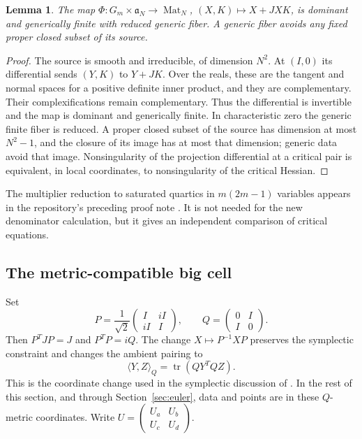 \documentclass[11pt]{article}
\newtheorem{lemma}[theorem]{Lemma}
\theoremstyle{remark}\newtheorem{remark}[theorem]{Remark}
\DeclareMathOperator{\tr}{tr}
\DeclareMathOperator{\Mat}{Mat}
\begin{document}
\begin{lemma}\label{lem:generic}
The map $\Phi:G_m\times\mathfrak a_N\to\Mat_N$, $(X,K)\mapsto X+JXK$, is dominant and generically finite with reduced generic fiber. A generic fiber avoids any fixed proper closed subset of its source.
\end{lemma}
\begin{proof}
The source is smooth and irreducible, of dimension $N^2$. At $(I,0)$ its differential sends $(Y,K)$ to $Y+JK$. Over the reals, these are the tangent and normal spaces for a positive definite inner product, and they are complementary. Their complexifications remain complementary. Thus the differential is invertible and the map is dominant and generically finite. In characteristic zero the generic finite fiber is reduced. A proper closed subset of the source has dimension at most $N^2-1$, and the closure of its image has at most that dimension; generic data avoid that image. Nonsingularity of the projection differential at a critical pair is equivalent, in local coordinates, to nonsingularity of the critical Hessian.
\end{proof}
The multiplier reduction to saturated quartics in $m(2m-1)$ variables appears in the repository's preceding proof note \cite{holden}. It is not needed for the new denominator calculation, but it gives an independent comparison of critical equations.

\subsection{The metric-compatible big cell}
Set
\[
P=\frac1{\sqrt2}\begin{pmatrix}I&iI\\iI&I\end{pmatrix},\qquad
Q=\begin{pmatrix}0&I\\I&0\end{pmatrix}.
\]
Then $P^TJP=J$ and $P^TP=iQ$. The change $X\mapsto P^{-1}XP$ preserves the symplectic constraint and changes the ambient pairing to
\[
\langle Y,Z\rangle_Q=\tr(QY^TQZ).
\]
This is the coordinate change used in the symplectic discussion of \cite{BD}. In the rest of this section, and through Section~\ref{sec:euler}, data and points are in these $Q$-metric coordinates. Write $U=\left(\begin{smallmatrix}U_a&U_b\\U_c&U_d\end{smallmatrix}\right)$.
\end{document}

